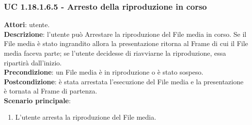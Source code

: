 	\subsubsection{UC 1.18.1.6.5 - Arresto della riproduzione in corso}{
		\label{uc1.18.1.6.5}
		\textbf{Attori}: utente. \\
		\textbf{Descrizione}: l'utente può Arrestare la riproduzione del File media in corso. Se il File media è stato ingrandito allora la presentazione ritorna al Frame di cui il File media faceva parte; se l'utente decidesse di riavviarne la riproduzione, essa ripartirà dall'inizio.\\
		\textbf{Precondizione}: un File media è in riproduzione o è stato sospeso.	\\
		\textbf{Postcondizione}: è stata arrestata l'esecuzione del File media e la presentazione è tornata al Frame di partenza.\\
		\textbf{Scenario principale}:
		\begin{enumerate}
			\item L'utente arresta la riproduzione del File media.
		\end{enumerate}		
	}

